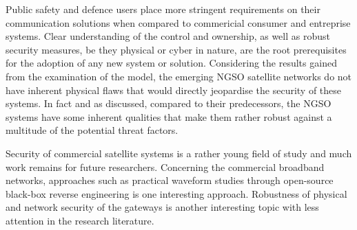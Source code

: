\documentclass[english, 12pt, a4paper, elec, utf8, a-1b, online]{aaltothesis}
\begin{document}
Public safety and defence users place more stringent requirements on their communication solutions when compared to commericial consumer and entreprise systems.
Clear understanding of the control and ownership, as well as robust security measures, be they physical or cyber in nature, are the root prerequisites for the adoption of any new system or solution.
Considering the results gained from the examination of the model, the emerging NGSO satellite networks do not have inherent physical flaws that would directly jeopardise the security of these systems.
In fact and as discussed, compared to their predecessors, the NGSO systems have some inherent qualities that make them rather robust against a multitude of the potential threat factors.

Security of commercial satellite systems is a rather young field of study and much work remains for future researchers. Concerning the commercial broadband networks, approaches such as practical waveform studies through open-source black-box reverse engineering is one interesting approach. Robustness of physical and network security of the gateways is another interesting topic with less attention in the research literature.







\clearpage

\thesisbibliography




\clearpage
\end{document}
